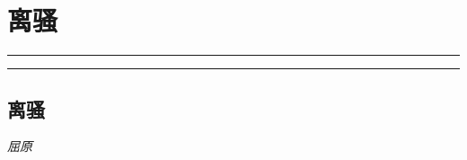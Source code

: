 \documentclass[]{article}
\date{}
\begin{document}
\hypertarget{header-n0}{%
\section{离骚}\label{header-n0}}

\begin{center}\rule{0.5\linewidth}{\linethickness}\end{center}

\tableofcontents

\begin{center}\rule{0.5\linewidth}{\linethickness}\end{center}

\hypertarget{header-n6}{%
\subsection{离骚}\label{header-n6}}

\emph{屈原}
\end{document}
